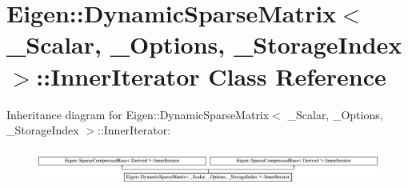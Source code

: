 \hypertarget{class_eigen_1_1_dynamic_sparse_matrix_1_1_inner_iterator}{}\section{Eigen\+:\+:Dynamic\+Sparse\+Matrix$<$ \+\_\+\+Scalar, \+\_\+\+Options, \+\_\+\+Storage\+Index $>$\+:\+:Inner\+Iterator Class Reference}
\label{class_eigen_1_1_dynamic_sparse_matrix_1_1_inner_iterator}
Inheritance diagram for Eigen\+:\+:Dynamic\+Sparse\+Matrix$<$ \+\_\+\+Scalar, \+\_\+\+Options, \+\_\+\+Storage\+Index $>$\+:\+:Inner\+Iterator\+:\begin{figure}[H]
\begin{center}
\leavevmode
\includegraphics[height=1.181435cm]{class_eigen_1_1_dynamic_sparse_matrix_1_1_inner_iterator}
\end{center}
\end{figure}
